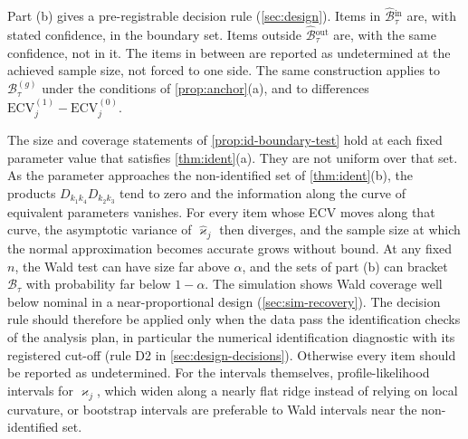 Part (b) gives a pre-registrable decision rule (\cref{sec:design}). Items in $\widehat{\mathcal B}{}^{\mathrm{in}}_\tau$ are, with stated confidence, in the boundary set. Items outside $\widehat{\mathcal B}{}^{\mathrm{out}}_\tau$ are, with the same confidence, not in it. The items in between are reported as undetermined at the achieved sample size, not forced to one side. The same construction applies to $\mathcal B^{(g)}_\tau$ under the conditions of \cref{prop:anchor}(a), and to differences $\mathrm{ECV}^{(1)}_j-\mathrm{ECV}^{(0)}_j$.

\begin{remark}\label{rem:id-test-uniform}
The size and coverage statements of \cref{prop:id-boundary-test} hold at each fixed parameter value that satisfies \cref{thm:ident}(a). They are not uniform over that set. As the parameter approaches the non-identified set of \cref{thm:ident}(b), the products $D_{k_1k_4}D_{k_2k_3}$ tend to zero and the information along the curve of equivalent parameters vanishes. For every item whose ECV moves along that curve, the asymptotic variance of $\widehat\varkappa_j$ then diverges, and the sample size at which the normal approximation becomes accurate grows without bound. At any fixed $n$, the Wald test can have size far above $\alpha$, and the sets of part (b) can bracket $\mathcal B_\tau$ with probability far below $1-\alpha$. The simulation shows Wald coverage well below nominal in a near-proportional design (\cref{sec:sim-recovery}). The decision rule should therefore be applied only when the data pass the identification checks of the analysis plan, in particular the numerical identification diagnostic with its registered cut-off (rule D2 in \cref{sec:design-decisions}). Otherwise every item should be reported as undetermined. For the intervals themselves, profile-likelihood intervals for $\varkappa_j$, which widen along a nearly flat ridge instead of relying on local curvature, or bootstrap intervals are preferable to Wald intervals near the non-identified set.
\end{remark}
